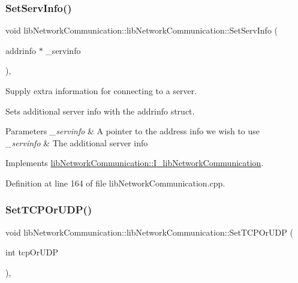 \subsubsection{\texorpdfstring{SetServInfo()}{SetServInfo()}}
{\footnotesize\ttfamily void lib\+Network\+Communication\+::lib\+Network\+Communication\+::\+Set\+Serv\+Info (\begin{DoxyParamCaption}\item[{addrinfo $\ast$}]{\+\_\+servinfo }\end{DoxyParamCaption})\hspace{0.3cm}{\ttfamily [override]}, {\ttfamily [virtual]}}



Supply extra information for connecting to a server. 

Sets additional server info with the addrinfo struct.


\begin{DoxyParams}{Parameters}
{\em \+\_\+servinfo} & A pointer to the address info we wish to use\\
\hline
{\em \+\_\+servinfo} & The additional server info \\
\hline
\end{DoxyParams}


Implements \mbox{\hyperlink{classlibNetworkCommunication_1_1I__libNetworkCommunication_a81430f6597c0831acbd1427fafd02f56}{lib\+Network\+Communication\+::\+I\+\_\+lib\+Network\+Communication}}.



Definition at line 164 of file lib\+Network\+Communication.\+cpp.

\mbox{\label{classlibNetworkCommunication_1_1libNetworkCommunication_a620cba1d9e2204dc9ef6b6897e8b6736}} 
\subsubsection{\texorpdfstring{SetTCPOrUDP()}{SetTCPOrUDP()}}
{\footnotesize\ttfamily void lib\+Network\+Communication\+::lib\+Network\+Communication\+::\+Set\+T\+C\+P\+Or\+U\+DP (\begin{DoxyParamCaption}\item[{int}]{tcp\+Or\+U\+DP }\end{DoxyParamCaption})\hspace{0.3cm}{\ttfamily [override]}, {\ttfamily [virtual]}}



